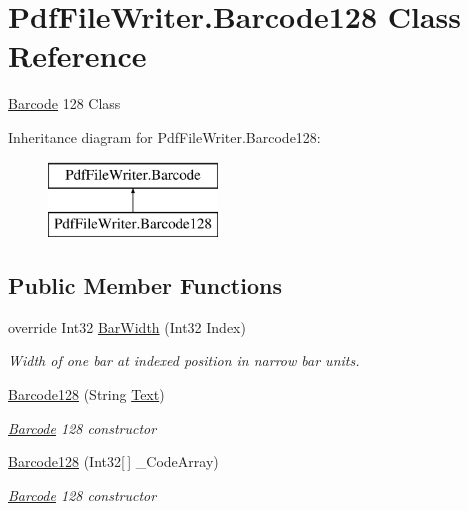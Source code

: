 \hypertarget{class_pdf_file_writer_1_1_barcode128}{}\section{Pdf\+File\+Writer.\+Barcode128 Class Reference}
\label{class_pdf_file_writer_1_1_barcode128}


\hyperlink{class_pdf_file_writer_1_1_barcode}{Barcode} 128 Class  


Inheritance diagram for Pdf\+File\+Writer.\+Barcode128\+:\begin{figure}[H]
\begin{center}
\leavevmode
\includegraphics[height=2.000000cm]{class_pdf_file_writer_1_1_barcode128}
\end{center}
\end{figure}
\subsection*{Public Member Functions}
\begin{DoxyCompactItemize}
\item 
override Int32 \hyperlink{class_pdf_file_writer_1_1_barcode128_a7eecad8aefc9b8ea2c51902d5ed3ecfb}{Bar\+Width} (Int32 Index)
\begin{DoxyCompactList}\small\item\em Width of one bar at indexed position in narrow bar units. \end{DoxyCompactList}\item 
\hyperlink{class_pdf_file_writer_1_1_barcode128_a50ecd58b398756c4f2e49edfa9617e99}{Barcode128} (String \hyperlink{class_pdf_file_writer_1_1_barcode_a1fe2157662e4a1b52264823a382fde3f}{Text})
\begin{DoxyCompactList}\small\item\em \hyperlink{class_pdf_file_writer_1_1_barcode}{Barcode} 128 constructor \end{DoxyCompactList}\item 
\hyperlink{class_pdf_file_writer_1_1_barcode128_a040f23b487e34b2b940874883e5fd331}{Barcode128} (Int32\mbox{[}$\,$\mbox{]} \+\_\+\+Code\+Array)
\begin{DoxyCompactList}\small\item\em \hyperlink{class_pdf_file_writer_1_1_barcode}{Barcode} 128 constructor \end{DoxyCompactList}\end{DoxyCompactItemize}
